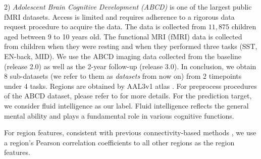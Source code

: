 2) \textit{Adolescent Brain Cognitive Development (ABCD)} \citep{casey2018adolescent} is one of the largest public fMRI datasets. Access is limited and requires adherence to a rigorous data request procedure to acquire the data. The data is collected from $11,875$ children aged between 9 to 10 years old. The functional MRI (fMRI) data is collected from children when they were resting and when they performed three tasks (SST, EN-back, MID). We use the ABCD imaging data collected from the baseline (release 2.0) as well as the 2-year follow-up (release 3.0). In conclusion, we obtain $8$ sub-datasets (we refer to them as \textit{datasets} from now on) from $2$ timepoints under $4$ tasks. Regions are obtained by AAL3v1 atlas \citep{rolls2020automated}. For preprocess procedures of the ABCD dataset, please refer to \citet{qiu2023learning} for more details. For the prediction target, we consider fluid intelligence as our label. Fluid intelligence reflects the general mental ability and plays a fundamental role in various cognitive functions.

For region features, consistent with previous connectivity-based methods \citep{li2021braingnn,kan2022brain,ktena2018metric,said2023neurograph}, we use a region's Pearson correlation coefficients to all other regions as the region features.


